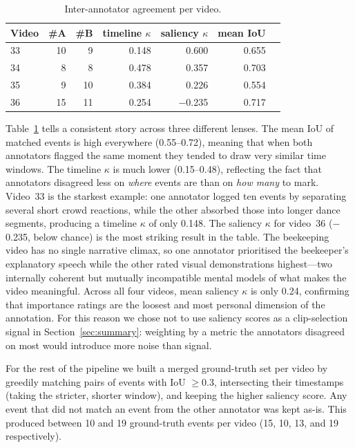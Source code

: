 \documentclass[sigconf, nonacm]{acmart}
\begin{document}
\begin{table}[h]
  \centering
  \caption{Inter-annotator agreement per video.}
  \label{tab:iaa}
  \begin{tabular}{lrrrrrr}
    \toprule
    Video & \#A & \#B & timeline $\kappa$ & saliency $\kappa$ & mean IoU \\
    \midrule
    33 & 10 &  9 & 0.148 & \phantom{$-$}0.600 & 0.655 \\
    34 &  8 &  8 & 0.478 & \phantom{$-$}0.357 & 0.703 \\
    35 &  9 & 10 & 0.384 & \phantom{$-$}0.226 & 0.554 \\
    36 & 15 & 11 & 0.254 &            $-$0.235 & 0.717 \\
    \bottomrule
  \end{tabular}
\end{table}

Table~\ref{tab:iaa} tells a consistent story across three different lenses.
The mean IoU of matched events is high everywhere (0.55--0.72), meaning
that when both annotators flagged the same moment they tended to draw very
similar time windows. The timeline $\kappa$ is much lower (0.15--0.48),
reflecting the fact that annotators disagreed less on \emph{where} events
are than on \emph{how many} to mark. Video~33 is the starkest example: one
annotator logged ten events by separating several short crowd reactions,
while the other absorbed those into longer dance segments, producing a
timeline $\kappa$ of only 0.148. The saliency $\kappa$ for video~36
($-$0.235, below chance) is the most striking result in the table. The
beekeeping video has no single narrative climax, so one annotator
prioritised the beekeeper's explanatory speech while the other rated visual
demonstrations highest---two internally coherent but mutually incompatible
mental models of what makes the video meaningful. Across all four videos,
mean saliency $\kappa$ is only 0.24, confirming that importance ratings are
the loosest and most personal dimension of the annotation. For this reason
we chose not to use saliency scores as a clip-selection signal in
Section~\ref{sec:summary}: weighting by a metric the annotators disagreed
on most would introduce more noise than signal.

For the rest of the pipeline we built a merged ground-truth set per video
by greedily matching pairs of events with IoU $\geq 0.3$, intersecting
their timestamps (taking the stricter, shorter window), and keeping the
higher saliency score. Any event that did not match an event from the other
annotator was kept as-is. This produced between 10 and 19 ground-truth
events per video (15, 10, 13, and 19 respectively).
\end{document}
